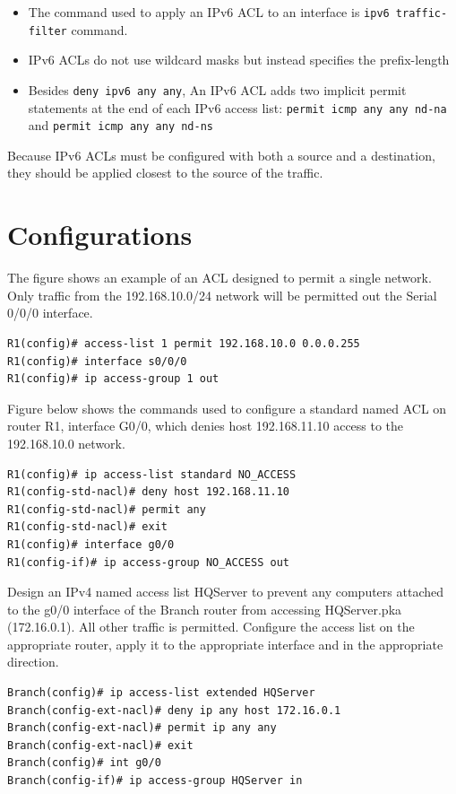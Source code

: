 \begin{itemize}
\item The command used to apply an IPv6 ACL to an interface is \texttt{ipv6 traffic-filter} command.
\item IPv6 ACLs do not use wildcard masks but instead specifies the prefix-length
\item Besides \texttt{deny ipv6 any any}, An IPv6 ACL adds two implicit permit statements at the end of each IPv6 access list: \texttt{permit icmp any any nd-na} and \texttt{permit icmp any any nd-ns}
\end{itemize}
	
Because IPv6 ACLs must be configured with both a source and a destination, they should be applied closest to the source of the traffic.

\section{Configurations}

\begin{example}
The figure shows an example of an ACL designed to permit a single network. Only traffic from the 192.168.10.0/24 network will be permitted out the Serial 0/0/0 interface.
\begin{verbatim}
R1(config)# access-list 1 permit 192.168.10.0 0.0.0.255
R1(config)# interface s0/0/0
R1(config)# ip access-group 1 out
\end{verbatim}
\end{example}

\begin{example}
Figure below shows the commands used to configure a standard named ACL on router R1, interface G0/0, which denies host 192.168.11.10 access to the 192.168.10.0 network.
\begin{verbatim}
R1(config)# ip access-list standard NO_ACCESS
R1(config-std-nacl)# deny host 192.168.11.10
R1(config-std-nacl)# permit any
R1(config-std-nacl)# exit
R1(config)# interface g0/0
R1(config-if)# ip access-group NO_ACCESS out
\end{verbatim}
\end{example}

\begin{example}
Design an IPv4 named access list HQServer to prevent any computers attached to the g0/0 interface of the Branch router from accessing HQServer.pka (172.16.0.1). All other traffic is permitted. Configure the access list on the appropriate router, apply it to the appropriate interface and in the appropriate direction.
\begin{verbatim}
Branch(config)# ip access-list extended HQServer
Branch(config-ext-nacl)# deny ip any host 172.16.0.1
Branch(config-ext-nacl)# permit ip any any
Branch(config-ext-nacl)# exit
Branch(config)# int g0/0
Branch(config-if)# ip access-group HQServer in
\end{verbatim}
\end{example}

